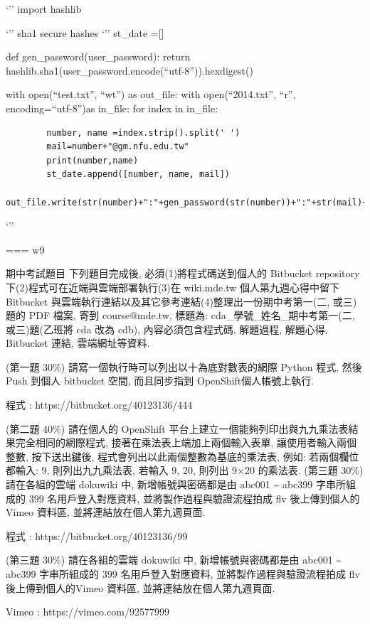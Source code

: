 \documentclass[]{article}
\begin{document}
`'' import hashlib

`'' sha1 secure hashes `'' st\_date ={[}{]}

def gen\_password(user\_password): return
hashlib.sha1(user\_password.encode(``utf-8'')).hexdigest()

with open(``test.txt'', ``wt'') as out\_file: with open(``2014.txt'',
``r'', encoding=``utf-8'')as in\_file: for index in in\_file:

\begin{verbatim}
        number, name =index.strip().split(' ')
        mail=number+"@gm.nfu.edu.tw"
        print(number,name)
        st_date.append([number, name, mail])
        out_file.write(str(number)+":"+gen_password(str(number))+":"+str(mail)+":user"+"\n")
\end{verbatim}

`''

=== w9

期中考試題目 下列題目完成後, 必須(1)將程式碼送到個人的 Bitbucket
repository 下(2)程式可在近端與雲端部署執行(3)在 wiki.mde.tw
個人第九週心得中留下 Bitbucket
與雲端執行連結以及其它參考連結(4)整理出一份期中考第一(二, 或三)題的 PDF
檔案, 寄到 course@mde.tw, 標題為: cda\_學號\_姓名\_期中考第一(二,
或三)題(乙班將 cda 改為 cdb), 內容必須包含程式碼, 解題過程, 解題心得,
Bitbucket 連結, 雲端網址等資料.

(第一題 30\%) 請寫一個執行時可以列出以十為底對數表的網際 Python 程式,
然後 Push 到個人 bitbucket 空間, 而且同步指到 OpenShift個人帳號上執行.

程式 : https://bitbucket.org/40123136/444

(第二題 40\%) 請在個人的 OpenShift
平台上建立一個能夠列印出與九九乘法表結果完全相同的網際程式,
接著在乘法表上端加上兩個輸入表單, 讓使用者輸入兩個整數, 按下送出鍵後,
程式會列出以此兩個整數為基底的乘法表, 例如: 若兩個欄位都輸入: 9,
則列出九九乘法表, 若輸入 9, 20, 則列出 9×20 的乘法表. (第三題 30\%)
請在各組的雲端 dokuwiki 中, 新增帳號與密碼都是由 abc001
\textasciitilde{} abc399 字串所組成的 399 名用戶登入對應資料,
並將製作過程與驗證流程拍成 flv 後上傳到個人的 Vimeo 資料區,
並將連結放在個人第九週頁面.

程式 : https://bitbucket.org/40123136/99

(第三題 30\%) 請在各組的雲端 dokuwiki 中, 新增帳號與密碼都是由 abc001
\textasciitilde{} abc399 字串所組成的 399 名用戶登入對應資料,
並將製作過程與驗證流程拍成 flv 後上傳到個人的Vimeo 資料區,
並將連結放在個人第九週頁面.

Vimeo : https://vimeo.com/92577999
\end{document}
